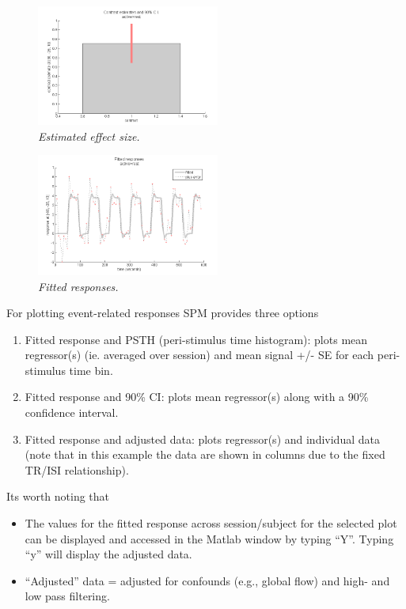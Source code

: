 \begin{figure}
\begin{center}
\includegraphics[width=60mm]{auditory/contrast}
\caption{\em Estimated effect size. \label{aud_contrast}}
\end{center}
\end{figure}

\begin{figure}
\begin{center}
\includegraphics[width=60mm]{auditory/fitted}
\caption{\em Fitted responses. \label{aud_fitted}}
\end{center}
\end{figure}

For plotting event-related responses SPM provides three options

\begin{enumerate}
\item Fitted response and PSTH (peri-stimulus time histogram): plots mean regressor(s) (ie. averaged over session) and mean signal +/- SE for each peri-stimulus time bin.
\item Fitted response and 90\% CI: plots mean regressor(s) along with a 90\% confidence interval.
\item Fitted response and adjusted data: plots regressor(s) and individual data (note that in this example the data are shown in columns due to the fixed TR/ISI relationship).
\end{enumerate}

Its worth noting that

\begin{itemize}
\item The values for the fitted response across session/subject for the selected plot can be displayed and accessed in the Matlab window by typing ``Y''. Typing ``y'' will display the adjusted data.
\item ``Adjusted'' data = adjusted for confounds (e.g., global flow) and high- and low pass filtering.
\end{itemize}

